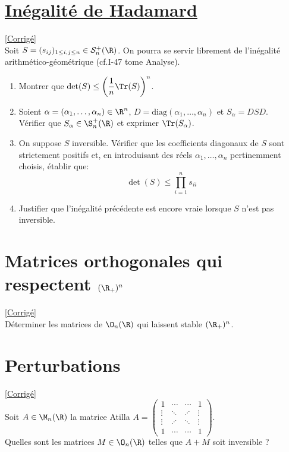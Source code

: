 \documentclass[8pt]{book}
\begin{document}
\section{\underline{Inégalité de Hadamard} }
\label{Inégalité de Hadamard}
\textcolor{blue}{\hyperref[Inégalité de Hadamard corrigé]{[Corrigé]}}\\
Soit $S=(s_{ij})_{1\leq i,j\leq n}\in\mathcal S_n^+(\R)$.
On pourra se servir librement de l'inégalité arithmético-géométrique (cf.I-47 tome Analyse).
\begin{enumerate}
	\item Montrer que $\det(S)\leq \left(\dfrac{1}{n}\Tr(S)\right)^n$.
	\item Soient $\alpha=(\alpha_1,\dots,\alpha_n)\in\R^n$, $D=\text{diag}(\alpha_1,\dots,\alpha_n)$ et $S_{\alpha}=DSD$.\\
	Vérifier que $S_{\alpha}\in\S_n^+(\R)$ et exprimer $\Tr(S_{\alpha})$.
	\item On suppose $S$ inversible. Vérifier que les coefficients diagonaux de $S$ sont strictement positifs et, en introduisant des réels $\alpha_1,\dots,\alpha_n$ pertinemment choisis, établir que: $$\det(S)\leq \prod_{i=1}^n s_{ii}$$
	\item Justifier que l'inégalité précédente est encore vraie lorsque $S$ n'est pas inversible.
\end{enumerate}

\section{Matrices orthogonales qui respectent $(\R_+)^n$ }
\label{Matrices orthogonales qui respectent (R_+)^n}
\textcolor{blue}{\hyperref[Matrices orthogonales qui respectent (R_+)^n corrigé]{[Corrigé]}}\\
Déterminer les matrices de $\O_n(\R)$ qui laissent stable $(\R_+)^n$.

\section{Perturbations }
\label{Perturbations}
\textcolor{blue}{\hyperref[Perturbations corrigé]{[Corrigé]}}\\
Soit $A\in \M_n(\R)$ la matrice Atilla $A=\begin{pmatrix}
	1&\cdots&\cdots&1\\
	\vdots&\ddots&\adots&\vdots\\
	\vdots&\adots&\ddots&\vdots\\
	1&\cdots&\cdots&1
\end{pmatrix}$.\\
Quelles sont les matrices $M\in \O_n(\R)$ telles que $A+M$ soit inversible ?
\end{document}
